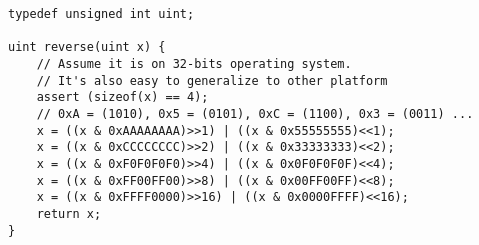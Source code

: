 \begin{verbatim}
typedef unsigned int uint;

uint reverse(uint x) {
	// Assume it is on 32-bits operating system.
	// It's also easy to generalize to other platform
	assert (sizeof(x) == 4);
	// 0xA = (1010), 0x5 = (0101), 0xC = (1100), 0x3 = (0011) ...
	x = ((x & 0xAAAAAAAA)>>1) | ((x & 0x55555555)<<1);
	x = ((x & 0xCCCCCCCC)>>2) | ((x & 0x33333333)<<2);
	x = ((x & 0xF0F0F0F0)>>4) | ((x & 0x0F0F0F0F)<<4);
	x = ((x & 0xFF00FF00)>>8) | ((x & 0x00FF00FF)<<8);
	x = ((x & 0xFFFF0000)>>16) | ((x & 0x0000FFFF)<<16);
	return x;
}               
\end{verbatim}
